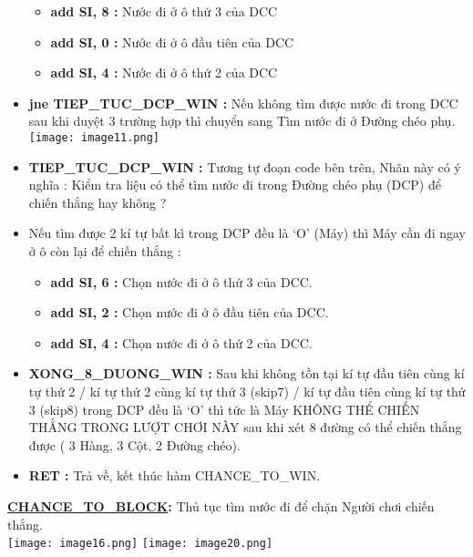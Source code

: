 \begin{itemize}
    \begin{itemize}
        \item \textbf{add SI, 8 :} Nước đi ở ô thứ 3 của DCC
        \item \textbf{add SI, 0 :} Nước đi ở ô đầu tiên của DCC
        \item \textbf{add SI, 4 :} Nước đi ở ô thứ 2 của DCC
    \end{itemize}
    \item \textbf{jne TIEP\_TUC\_DCP\_WIN :} Nếu không tìm được nước đi trong DCC sau khi duyệt 3 trường hợp thì chuyển sang Tìm nước đi ở Đường chéo phụ.
    \texttt{[image: image11.png]}
    \item \textbf{TIEP\_TUC\_DCP\_WIN : }Tương tự đoạn code bên trên, Nhãn này có ý nghĩa : Kiểm tra liệu có thể tìm nước đi trong Đường chéo phụ (DCP) để chiến thắng hay không ?
    \item Nếu tìm được 2 kí tự bất kì trong DCP đều là ‘O’ (Máy) thì Máy cần đi ngay ở ô còn lại để chiến thắng : 
    \begin{itemize}
        \item \textbf{add SI, 6 : }Chọn nước đi ở ô thứ 3 của DCC.
        \item \textbf{add SI, 2 : }Chọn nước đi ở ô đầu tiên của DCC.
        \item \textbf{add SI, 4 : }Chọn nước đi ở ô thứ 2 của DCC.
    \end{itemize}
    \item \textbf{XONG\_8\_DUONG\_WIN :} Sau khi không tồn tại kí tự đầu tiên cùng kí tự thứ 2 / kí tự thứ 2 cùng kí tự thứ 3 (skip7) / kí tự đầu tiên cùng kí tự thứ 3 (skip8) trong DCP đều là ‘O’ thì tức là Máy KHÔNG THỂ CHIẾN THẮNG TRONG LƯỢT CHƠI NÀY sau khi xét 8 đường có thể chiến thắng được ( 3 Hàng, 3 Cột, 2 Đường chéo).
    \item \textbf{RET :} Trả về, kết thúc hàm CHANCE\_TO\_WIN.
\end{itemize}


\textbf{\underline{CHANCE\_TO\_BLOCK}: }Thủ tục tìm nước đi để chặn Người chơi chiến thắng.\\
\texttt{[image: image16.png]}
\texttt{[image: image20.png]}

